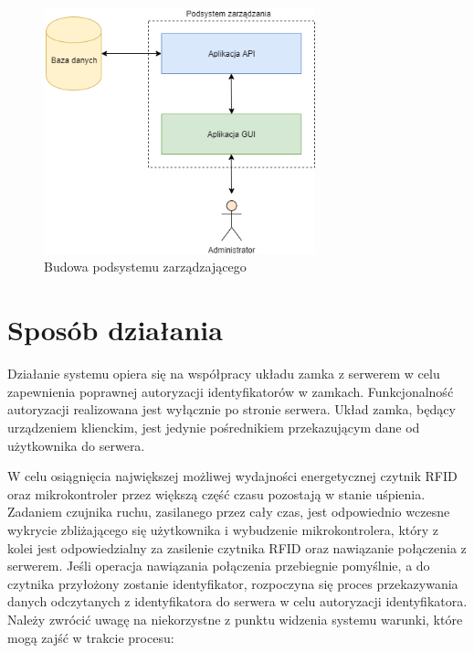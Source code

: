             \begin{figure}[h!]
                \centering
                \includegraphics[width=0.7\textwidth]{chapters/images/mngmt_subsystem.png}
                \caption{Budowa podsystemu zarządzającego}
                \label{fig:mngmt_subsystem}
            \end{figure}

        \pagebreak

        \section{Sposób działania}
            Działanie systemu opiera się na współpracy układu zamka z serwerem w celu zapewnienia poprawnej autoryzacji identyfikatorów w zamkach. Funkcjonalność autoryzacji realizowana jest wyłącznie po stronie serwera. Układ zamka, będący urządzeniem klienckim, jest jedynie pośrednikiem przekazującym dane od użytkownika do serwera.

            W celu osiągnięcia największej możliwej wydajności energetycznej czytnik RFID oraz mikrokontroler przez większą część czasu pozostają w stanie uśpienia. Zadaniem czujnika ruchu, zasilanego przez cały czas, jest odpowiednio wczesne wykrycie zbliżającego się użytkownika i wybudzenie mikrokontrolera, który z kolei jest odpowiedzialny za zasilenie czytnika RFID oraz nawiązanie połączenia z serwerem. Jeśli operacja nawiązania połączenia przebiegnie pomyślnie, a do czytnika przyłożony zostanie identyfikator, rozpoczyna się proces przekazywania danych odczytanych z identyfikatora do serwera w celu autoryzacji identyfikatora. Należy zwrócić uwagę na niekorzystne z punktu widzenia systemu warunki, które mogą zajść w trakcie procesu:

